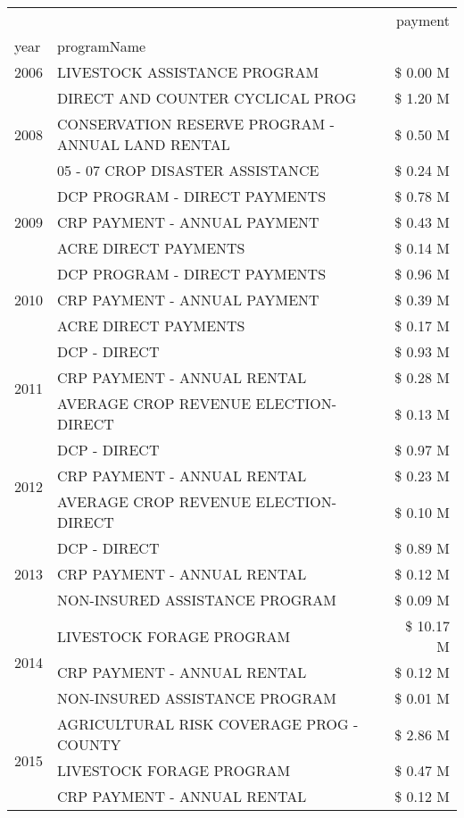 \begin{tabular}{llr}
\toprule
 &  & payment \\
year & programName &  \\
\midrule
2006 & LIVESTOCK ASSISTANCE PROGRAM & \$ 0.00 M \\
\cline{1-3}
\multirow[t]{3}{*}{2008} & DIRECT AND COUNTER CYCLICAL PROG & \$ 1.20 M \\
 & CONSERVATION RESERVE PROGRAM - ANNUAL LAND RENTAL & \$ 0.50 M \\
 & 05 - 07 CROP DISASTER ASSISTANCE & \$ 0.24 M \\
\cline{1-3}
\multirow[t]{3}{*}{2009} & DCP PROGRAM - DIRECT PAYMENTS & \$ 0.78 M \\
 & CRP PAYMENT - ANNUAL PAYMENT & \$ 0.43 M \\
 & ACRE DIRECT PAYMENTS & \$ 0.14 M \\
\cline{1-3}
\multirow[t]{3}{*}{2010} & DCP PROGRAM - DIRECT PAYMENTS & \$ 0.96 M \\
 & CRP PAYMENT - ANNUAL PAYMENT & \$ 0.39 M \\
 & ACRE DIRECT PAYMENTS & \$ 0.17 M \\
\cline{1-3}
\multirow[t]{3}{*}{2011} & DCP - DIRECT & \$ 0.93 M \\
 & CRP PAYMENT - ANNUAL RENTAL & \$ 0.28 M \\
 & AVERAGE CROP REVENUE ELECTION-DIRECT & \$ 0.13 M \\
\cline{1-3}
\multirow[t]{3}{*}{2012} & DCP - DIRECT & \$ 0.97 M \\
 & CRP PAYMENT - ANNUAL RENTAL & \$ 0.23 M \\
 & AVERAGE CROP REVENUE ELECTION-DIRECT & \$ 0.10 M \\
\cline{1-3}
\multirow[t]{3}{*}{2013} & DCP - DIRECT & \$ 0.89 M \\
 & CRP PAYMENT - ANNUAL RENTAL & \$ 0.12 M \\
 & NON-INSURED ASSISTANCE PROGRAM & \$ 0.09 M \\
\cline{1-3}
\multirow[t]{3}{*}{2014} & LIVESTOCK FORAGE PROGRAM & \$ 10.17 M \\
 & CRP PAYMENT - ANNUAL RENTAL & \$ 0.12 M \\
 & NON-INSURED ASSISTANCE PROGRAM & \$ 0.01 M \\
\cline{1-3}
\multirow[t]{3}{*}{2015} & AGRICULTURAL RISK COVERAGE PROG - COUNTY & \$ 2.86 M \\
 & LIVESTOCK FORAGE PROGRAM & \$ 0.47 M \\
 & CRP PAYMENT - ANNUAL RENTAL & \$ 0.12 M \\

\end{tabular}
